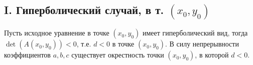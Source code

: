 \documentclass[12pt, a4paper]{article}
\begin{document}
\subsection*{I. Гиперболический случай, в т. $(x_0, y_0)$}
Пусть исходное уравнение в точке $(x_0, y_0)$ имеет гиперболический вид, тогда $\det(A(x_0, y_0)) < 0$, т.е. $d < 0$ в точке $(x_0, y_0)$.
В силу непрерывности коэффициентов $a, b, c$ существует окрестность точки $(x_0, y_0)$, в которой $d < 0$.


\end{document}
